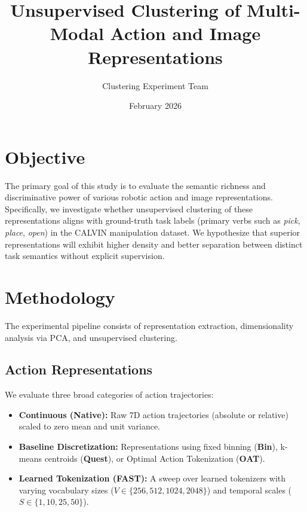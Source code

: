 \documentclass{article}
\title{Unsupervised Clustering of Multi-Modal Action and Image Representations}
\author{Clustering Experiment Team}
\date{February 2026}
\begin{document}
\maketitle

\section{Objective}
The primary goal of this study is to evaluate the semantic richness and discriminative power of various robotic action and image representations. Specifically, we investigate whether unsupervised clustering of these representations aligns with ground-truth task labels (primary verbs such as \textit{pick}, \textit{place}, \textit{open}) in the CALVIN manipulation dataset. We hypothesize that superior representations will exhibit higher density and better separation between distinct task semantics without explicit supervision.

\section{Methodology}
The experimental pipeline consists of representation extraction, dimensionality analysis via PCA, and unsupervised clustering.

\subsection{Action Representations}
We evaluate three broad categories of action trajectories:
\begin{itemize}
    \item \textbf{Continuous (Native):} Raw 7D action trajectories (absolute or relative) scaled to zero mean and unit variance.
    \item \textbf{Baseline Discretization:} Representations using fixed binning (\textbf{Bin}), k-means centroids (\textbf{Quest}), or Optimal Action Tokenization (\textbf{OAT}).
    \item \textbf{Learned Tokenization (FAST):} A sweep over learned tokenizers with varying vocabulary sizes ($V \in \{256, 512, 1024, 2048\}$) and temporal scales ($S \in \{1, 10, 25, 50\}$).
\end{itemize}
\end{document}
